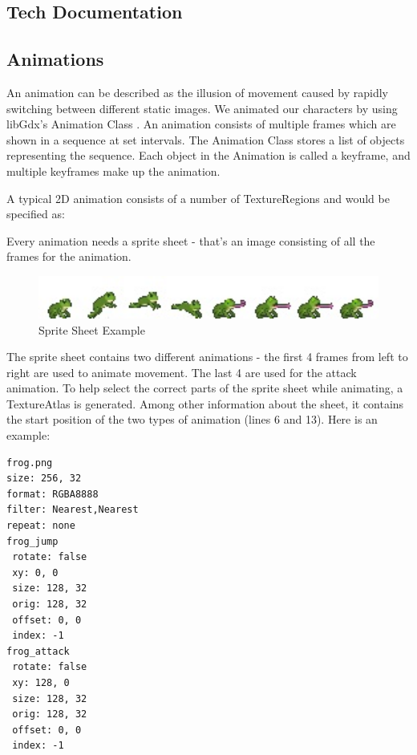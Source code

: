 \documentclass[12p]{article}
\begin{document}

\subsection{Tech Documentation} \label{DocTech}


\subsection{Animations} \label{DocAnimations}

An animation can be described as the illusion of movement caused by rapidly switching between different static images. We animated our characters by using libGdx's Animation Class \cite{libGdxAnimClass}. An animation consists of multiple frames which are shown in a sequence at set intervals. The Animation Class stores a list of objects representing the sequence. Each object in the Animation is called a keyframe, and multiple keyframes make up the animation.

A typical 2D animation consists of a number of TextureRegions and would be specified as:


Every animation needs a sprite sheet - that's an image consisting of all the frames for the animation.

\begin{figure}[ht]
  \center
  \includegraphics[width=1\textwidth]{Documentation/frog.jpg}
  \caption{Sprite Sheet Example}
  \label{SpriteSheetExample}
\end{figure}

The sprite sheet contains two different animations - the first 4 frames from left to right are used to animate movement. The last 4 are used for the attack animation. To help select the correct parts of the sprite sheet while animating, a TextureAtlas is generated. Among other information about the sheet, it contains the start position of the two types of animation (lines 6 and 13). Here is an example:

\begin{verbatim}
frog.png
size: 256, 32
format: RGBA8888
filter: Nearest,Nearest
repeat: none
frog_jump
 rotate: false
 xy: 0, 0
 size: 128, 32
 orig: 128, 32
 offset: 0, 0
 index: -1
frog_attack
 rotate: false
 xy: 128, 0
 size: 128, 32
 orig: 128, 32
 offset: 0, 0
 index: -1
\end{verbatim}
\end{document}
